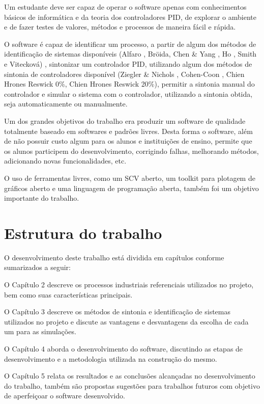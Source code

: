     Um estudante deve ser capaz de operar o software apenas com conhecimentos
    básicos de informática e da teoria dos controladores \acs{PID}, de explorar o
    ambiente e de fazer testes de valores, métodos e processos de maneira fácil e
    rápida.
    
    O software é capaz de identificar um processo, a partir de algum dos
    métodos de identificação de sistemas disponíveis (Alfaro \cite{Alfaro2}, Bröida,
    Chen \& Yang \cite{ChenYang}, Ho \cite{Ho}, Smith \cite{Smith} e Vitecková)
    \cite{Viteckova}, sintonizar um controlador \acs{PID},
    utilizando algum dos métodos de sintonia de controladores disponível (Ziegler
    \& Nichols \cite{ZieglerNicholsAsme}, Cohen-Coon \cite{CohenCoon},
    Chien Hrones Reswick 0\%, Chien Hrones Reswick 20\%),
    permitir a sintonia manual do controlador e simular o sistema com o controlador,
    utilizando a sintonia obtida, seja automaticamente ou manualmente.
    
    Um dos grandes objetivos do trabalho era produzir um software de qualidade 
    totalmente baseado em softwares e padrões livres. Desta forma o software,
    além de não possuir custo algum para os alunos e instituições de ensino, permite
    que os alunos participem do desenvolvimento, corrigindo falhas, melhorando
    métodos, adicionando novas funcionalidades, etc.
    
    O uso de ferramentas livres, como um \ac{SCV} aberto, um toolkit para plotagem
    de gráficos aberto e uma linguagem de programação aberta, também foi um objetivo
    importante do trabalho.

\section{Estrutura do trabalho}

    O desenvolvimento deste trabalho está dividida em capítulos conforme sumarizados
    a seguir:

    O Capítulo 2 descreve os processos industriais referenciais utilizados no projeto,
    bem como suas características principais.
    
    O Capítulo 3 descreve os métodos de sintonia e identificação de sistemas utilizados
    no projeto e discute as vantagens e desvantagens da escolha de cada um para as
    simulações.
    
    O Capítulo 4 aborda o desenvolvimento do software, discutindo as etapas de
    desenvolvimento e a metodologia utilizada na construção do mesmo.
    
    O Capítulo 5 relata os resultados e as conclusões alcançadas no desenvolvimento do
    trabalho, também são propostas sugestões para trabalhos futuros com objetivo de
    aperfeiçoar o software desenvolvido.

